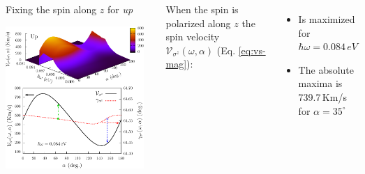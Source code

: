 \documentclass{beamer}
\begin{document}
\begin{frame}

\begin{columns}


\begin{center}

Fixing the spin along $z$ for \emph{up}

\vspace{2mm}

\includegraphics[width=0.95\textwidth]{figs/fig4.pdf}

\end{center}  



{ When the spin is polarized along $z$ the spin velocity
$\mathcal{V}_{\sigma^{z}}(\omega,\alpha)$ (Eq. \ref{eq:vs-mag}):}


\vspace{-2mm}

{\small

\begin{itemize}

\item 
Is maximized for $\hbar \omega = 0.084\,eV$

\vspace{-1mm}
\item 
The absolute maxima is 739.7\,Km/s for $\alpha = 35^{\circ}$


\end{itemize}}
\end{columns}
\end{frame}
\end{document}
